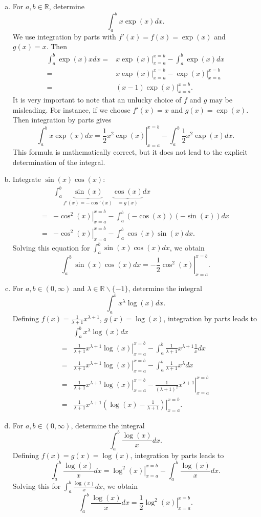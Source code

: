 \begin{example}
\begin{enumerate}[a)]
\item For $a,b\in\mathbb{R}$, determine
\[\int_a^bx\exp(x)dx.\]
We use integration by parts with $f'(x)=f(x)=\exp(x)$ and $g(x)=x$. Then
\[\begin{aligned}
\int_a^b\exp(x)xdx=&\left.x\exp(x)\right|_{x=a}^{x=b}-\int_a^b\exp(x)dx\\
=&\left.x\exp(x)\right|_{x=a}^{x=b}-\left.\exp(x)\right|_{x=a}^{x=b}\\=&\left.(x-1)\exp(x)\right|_{x=a}^{x=b}.
\end{aligned}
\]
It is very important to note that an unlucky choice of $f$ and $g$ may be misleading. For instance, if we choose $f'(x)=x$ and $g(x)=\exp(x)$. Then integration by parts gives
\[\int_a^bx\exp(x)dx=\left.\frac12x^2\exp(x)\right|_{x=a}^{x=b}-\int_a^b\frac12x^{2}\exp(x)dx.\]
This formula is mathematically correct, but it does not lead to the explicit determination of the integral.
\item Integrate $\sin(x)\cos(x)$:
\[
\begin{aligned}
&\int_a^b\underbrace{\sin(x)}_{f'(x)=-\cos'(x)}\underbrace{\cos(x)}_{=g(x)}dx\\=&\left.-\cos^2(x)\right|_{x=a}^{x=b}-\int_a^b(-\cos(x))(-\sin(x))dx\\
=&\left.-\cos^2(x)\right|_{x=a}^{x=b}-\int_a^b\cos(x)\sin(x)dx.
\end{aligned}
\]
Solving this equation for $\int_a^b\sin(x)\cos(x)dx$, we obtain
\[\int_a^b\sin(x)\cos(x)dx=\left.-\frac12\cos^2(x)\right|_{x=a}^{x=b}.\]
\item For $a,b\in(0,\infty)$ and $\lambda\in\mathbb{R}\backslash\{-1\}$, determine the integral
\[\int_a^bx^\lambda\log(x)dx.\]
Defining $f(x)=\frac1{\lambda+1}x^{\lambda+1}$, $g(x)=\log(x)$, integration by parts leads to
\[
\begin{aligned}
&\int_a^bx^\lambda\log(x)dx\\
=&\left.\frac1{\lambda+1}x^{\lambda+1}\log(x)\right|_{x=a}^{x=b}-\int_a^b\frac1{\lambda+1}x^{\lambda+1}\frac1xdx\\
=&\left.\frac1{\lambda+1}x^{\lambda+1}\log(x)\right|_{x=a}^{x=b}-\int_a^b\frac1{\lambda+1}x^{\lambda}dx\\
=&\left.\frac1{\lambda+1}x^{\lambda+1}\log(x)\right|_{x=a}^{x=b}-\left.\frac1{(\lambda+1)^2}x^{\lambda+1}\right|_{x=a}^{x=b}\\
=&\left.\frac1{\lambda+1}x^{\lambda+1}\left(\log(x)-\frac1{\lambda+1}\right)\right|_{x=a}^{x=b}.
\end{aligned}
\]
\item For $a,b\in(0,\infty)$, determine the integral
\[\int_a^b\frac{\log(x)}xdx.\]
Defining $f(x)=g(x)=\log(x)$, integration by parts leads to
\[
\int_a^b\frac{\log(x)}xdx
=\left.\log^2(x)\right|_{x=a}^{x=b}-\int_a^b\frac{\log(x)}xdx.
\]
Solving this for $\int_a^b\frac{\log(x)}xdx$, we obtain
\[
\int_a^b\frac{\log(x)}xdx
=\frac12\left.\log^2(x)\right|_{x=a}^{x=b}.
\]
\end{enumerate}
\end{example}


